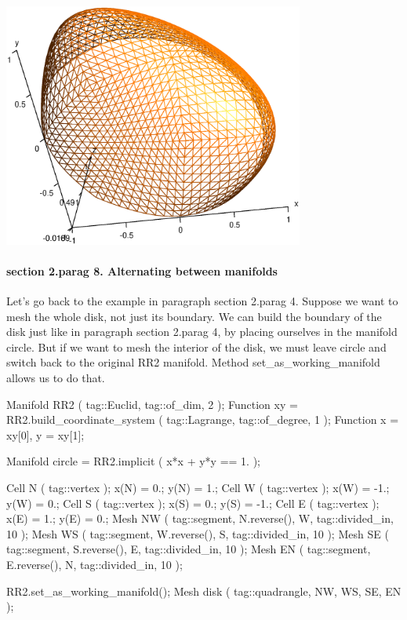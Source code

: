 \centerline{\includegraphics[width=99mm]{hemisphere-1.eps}}
\vfil\eject


\paragraph{\numb section 2.\numb parag 8. Alternating between manifolds}

Let's go back to the example in paragraph \numb section 2.\numb parag 4.
Suppose we want to mesh the whole disk, not just its boundary.
We can build the boundary of the disk just like in paragraph \numb section 2.\numb parag 4,
by placing ourselves in the manifold {\codett circle}.
But if we want to mesh the interior of the disk, we must leave {\codett circle} and
switch back to the original {\codett RR2} manifold.
Method {\codett set\_as\_working\_manifold} allows us to do that.

\verbatim
   Manifold RR2 ( tag::Euclid, tag::of_dim, 2 );
   Function xy = RR2.build_coordinate_system ( tag::Lagrange, tag::of_degree, 1 );
   Function x = xy[0],  y = xy[1];
   
   Manifold circle = RR2.implicit ( x*x + y*y == 1. );
   
   Cell N ( tag::vertex );  x(N) =  0.;   y(N) =  1.;
   Cell W ( tag::vertex );  x(W) = -1.;   y(W) =  0.;
   Cell S ( tag::vertex );  x(S) =  0.;   y(S) = -1.;
   Cell E ( tag::vertex );  x(E) =  1.;   y(E) =  0.;
   Mesh NW ( tag::segment, N.reverse(), W, tag::divided_in, 10 );
   Mesh WS ( tag::segment, W.reverse(), S, tag::divided_in, 10 );
   Mesh SE ( tag::segment, S.reverse(), E, tag::divided_in, 10 );
   Mesh EN ( tag::segment, E.reverse(), N, tag::divided_in, 10 );
   
   RR2.set_as_working_manifold();
   Mesh disk ( tag::quadrangle, NW, WS, SE, EN );
\endverbatim


